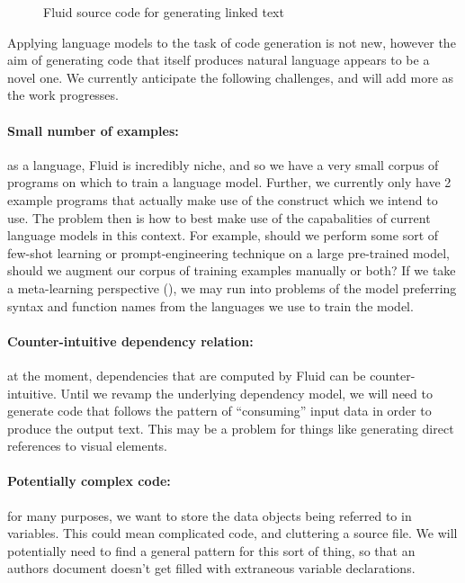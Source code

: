 \begin{figure}
   \tiny
   
   \caption{Fluid source code for generating linked text}
\end{figure}

Applying language models to the task of code generation is not new, however the aim of generating code that
itself produces natural language appears to be a novel one. We currently anticipate the following challenges,
and will add more as the work progresses.

\paragraph{Small number of examples:} as a language, Fluid is incredibly niche, and so we have a very small
corpus of programs on which to train a language model. Further, we currently only have 2 example programs that
actually make use of the  construct which we intend to use. The problem then is how to best
make use of the capabalities of current language models in this context. For example, should we perform some
sort of few-shot learning or prompt-engineering technique on a large pre-trained model, should we augment our
corpus of training examples manually or both? If we take a meta-learning perspective (), we may run
into problems of the model preferring syntax and function names from the languages we use to train the model.

\paragraph{Counter-intuitive dependency relation:} at the moment, dependencies that are computed by Fluid can
be counter-intuitive. Until we revamp the underlying dependency model, we will need to generate code that
follows the pattern of ``consuming'' input data in order to produce the output text. This may be a problem for
things like generating direct references to visual elements.

\paragraph{Potentially complex code:} for many purposes, we want to store the data objects being referred to
in variables. This could mean complicated code, and cluttering a source file. We will potentially need to find
a general pattern for this sort of thing, so that an authors document doesn't get filled with extraneous
variable declarations.
